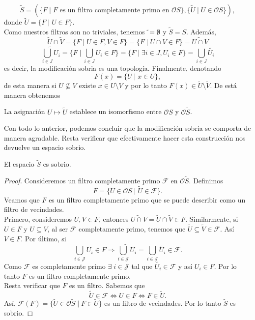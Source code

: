 \documentclass{comunicaciones}
\begin{document}
\[
\tilde{S}=(\{F\mid F \mbox{ es un filtro completamente primo en }\mathcal{O}S\}, \{\tilde{U}\mid U\in \mathcal{O}S\}),
\]
donde $\tilde{U}=\{F\mid U\in F\}$.\\

Como nuestros filtros son no triviales, tenemos $\tilde{\empty}=\emptyset$ y $\tilde{S}=S$. Además,
\[
\tilde{U} \cap \tilde{V}=\{F\mid U\in F, V\in F\}=\{F\mid U\cap V\in F\}=\widetilde{U\cap V}
\]
\[\widetilde{\bigcup_{i\in J}U_i}=\{F\mid \bigcup_{i\in J}U_i\in F\}=\{F\mid \exists i\in J, U_i\in F\}=\bigcup_{i\in J} \widetilde{U_i}
\]
es decir, la modificación sobria es una topología. Finalmente, denotando 
\[
F(x)=\{U\mid x\in U\},
\]
de esta manera si $U\nsubseteq V$ existe $x\in U\setminus V$ y por lo tanto $F(x)\in \tilde{U}\setminus \tilde{V}$. De está manera obtenemos 

\begin{obs}\label{Asobria}
La asignación $U\mapsto \tilde{U}$ establece un isomorfismo entre $\mathcal{O}S$ y $\mathcal{O}\tilde{S}$.
\end{obs}

Con todo lo anterior, podemos concluir que la modificación sobria se comporta de manera agradable. Resta verificar que efectivamente hacer esta construcción nos devuelve un espacio sobrio.

\begin{prop}
    El espacio $\tilde{S}$ es sobrio.
\end{prop}

\begin{proof}
    Consideremos un filtro completamente primo $\mathcal{F}$ en $\mathcal{O}\tilde{S}$. Definimos
    \[
    F=\{U\in \mathcal{O}S\mid \tilde{U}\in \mathcal{F}\}.
    \]
    Veamos que $F$ es un filtro completamente primo que se puede describir como un filtro de vecindades.\\

    \noindent
    Primero, consideremos $U, V\in F$, entonces $\widetilde{U\cap V}=\tilde{U}\cap \tilde{V}\in F$. Similarmente, si $U\in F$ y $U\subseteq V$, al ser $\mathcal{F}$ completamente primo, tenemos que $\tilde{U}\subseteq \tilde{V}\in \mathcal{F}$. Así $V\in F$. Por último, si 
    \[
    \bigcup_{i\in\mathcal{J}}U_i\in F\Rightarrow \widetilde{\bigcup_{i\in\mathcal{J}}U_i}=\bigcup_{i\in\mathcal{J}}\widetilde{U_i}\in \mathcal{F}.
    \]
    Como $\mathcal{F}$ es completamente primo $\exists\; i\in \mathcal{J}$ tal que $\widetilde{U_i}\in \mathcal{F}$ y así $U_i\in F$. Por lo tanto $F$ es un filtro completamente primo.\\

    \noindent
    Resta verificar que $F$ es un filtro. Sabemos que 
    \[
    \tilde{U}\in\mathcal{F}\Leftrightarrow U\in F\Leftrightarrow F\in \tilde{U}.
    \]
    Así, $\mathcal{F}(F)=\{\tilde{U}\in \mathcal{O}\tilde{S}\mid F\in \tilde{U}\}$ es un filtro de vecindades. Por lo tanto $\tilde{S}$ es sobrio.
\end{proof}
\end{document}
